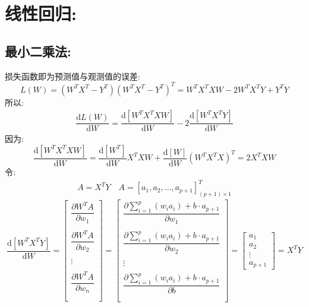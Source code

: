 \documentclass[withoutpreface,bwprint]{cumcmthesis} %
\begin{document}
	\section{\LARGE 线性回归:}
	
	\subsection{\Large 最小二乘法:}
	损失函数即为预测值与观测值的误差:
	\begin{equation}
		L(W)=(W^TX^T-Y^T)(W^TX^T-Y^T)^T=W^TX^TXW-2W^TX^TY+Y^TY
	\end{equation}
	所以:
	\begin{align*}
		\dfrac{\mathrm{d} L(W)}{\mathrm{d} W}=\dfrac{\mathrm{d }  [W^TX^TXW]}{\mathrm{d} W}
		-
		2\dfrac{\mathrm{d} [ W^TX^TY]}{\mathrm{d} W}
	\end{align*}
	因为:
	\begin{equation}
		\dfrac{\mathrm{d }  [W^TX^TXW]}{\mathrm{d} W}=\dfrac{\mathrm{d }  [W^T]}{\mathrm{d} W} X^TXW 
		+\dfrac{\mathrm{d }  [W]}{\mathrm{d} W} (W^TX^TX)^T=2X^TXW
	\end{equation}
	令:
	\begin{align*}
		A=X^TY \quad A=\left[
			a_1,a_2,\ldots,a_{p+1}
		\right]^T_{(p+1){\times} 1}
	\end{align*}
	\begin{equation}
		\dfrac{\mathrm{d} [ W^TX^TY]}{\mathrm{d} W}=\left[
			\begin{array}{c}
				\dfrac{\partial W^TA}{\partial w_1}\\\\
				\dfrac{\partial W^TA}{\partial w_2}\\\\
				\vdots\\\\
				\dfrac{\partial W^TA}{\partial w_n}\\\\
			\end{array}
		\right]=\left[
		\begin{array}{c}
			\dfrac{\partial \sum_{i=1}^{p}(w_ia_i)+b\cdot a_{p+1} }{\partial w_1}\\\\
			\dfrac{\partial \sum_{i=1}^{p}(w_ia_i)+b\cdot a_{p+1}}{\partial w_2}\\\\
			\vdots\\\\
			\dfrac{\partial \sum_{i=1}^{p}(w_ia_i)+b\cdot a_{p+1}}{\partial b}\\\\
		\end{array}
		\right]=\left[
			\begin{array}{c}
				a_1\\
				a_2\\
				\vdots\\
				a_{p+1}
			\end{array}
		\right]=X^TY
	\end{equation}
\end{document}
